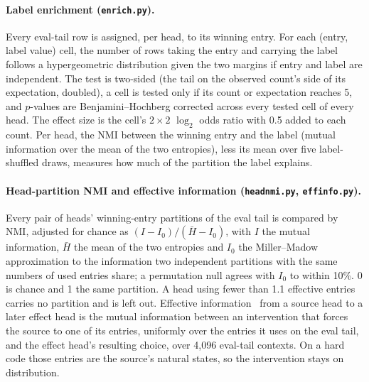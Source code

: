 \paragraph{Label enrichment (\texttt{enrich.py}).}
Every eval-tail row is assigned, per head, to its winning entry. For each
(entry, label value) cell, the number of rows taking the entry and
carrying the label follows a hypergeometric distribution given the two
margins if entry and label are independent. The test is two-sided (the
tail on the observed count's side of its expectation, doubled), a cell is
tested only if its count or expectation reaches 5, and $p$-values are
Benjamini--Hochberg corrected across every tested cell of every head. The
effect size is the cell's $2\times2$ $\log_2$ odds ratio with 0.5 added to
each count. Per head, the NMI between the winning entry and the label
(mutual information over the mean of the two entropies), less its mean
over five label-shuffled draws, measures how much of the partition the
label explains.

\paragraph{Head-partition NMI and effective information (\texttt{headnmi.py},
\texttt{effinfo.py}).}
Every pair of heads' winning-entry partitions of the eval tail is compared
by NMI, adjusted for chance as
$(I - I_0)/(\bar{H} - I_0)$, with $I$ the mutual information, $\bar{H}$
the mean of the two entropies and $I_0$ the Miller--Madow approximation to
the information two independent partitions with the same numbers of used
entries share; a permutation null agrees with $I_0$ to within 10\%. 0 is
chance and 1 the same partition. A head using fewer than 1.1 effective
entries carries no partition and is left out. Effective
information~\cite{hoel2013} from a source head to a later effect head is
the mutual information between an intervention that forces the source to
one of its entries, uniformly over the entries it uses on the eval tail,
and the effect head's resulting choice, over 4{,}096 eval-tail contexts.
On a hard code those entries are the source's natural states, so the
intervention stays on distribution.

